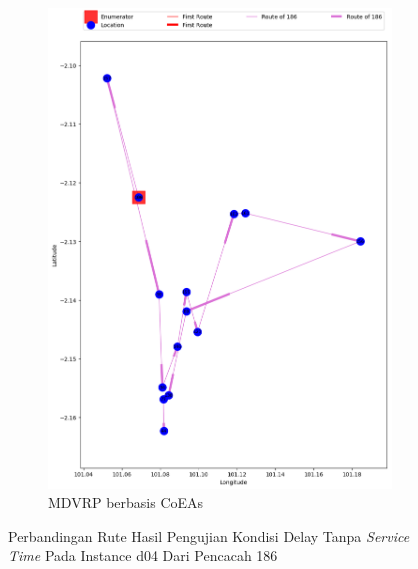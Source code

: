 \begin{figure}[H]
	\centering
	\begin{subfigure}[t]{\textwidth}
		\centering
		\includegraphics[width=\textwidth]{Resources/Images/delayed_4/real_m15_n100_delayed_4_186_coes}
		\caption{MDVRP berbasis CoEAs}
		\label{fig:real_m15_n100_delayed_4_186_coes}
	\end{subfigure}
	\caption{Perbandingan Rute Hasil Pengujian Kondisi Delay Tanpa \textit{Service Time} Pada Instance d04 Dari Pencacah 186}
	\label{fig:real_m15_n100_delayed_4_186}
\end{figure}


